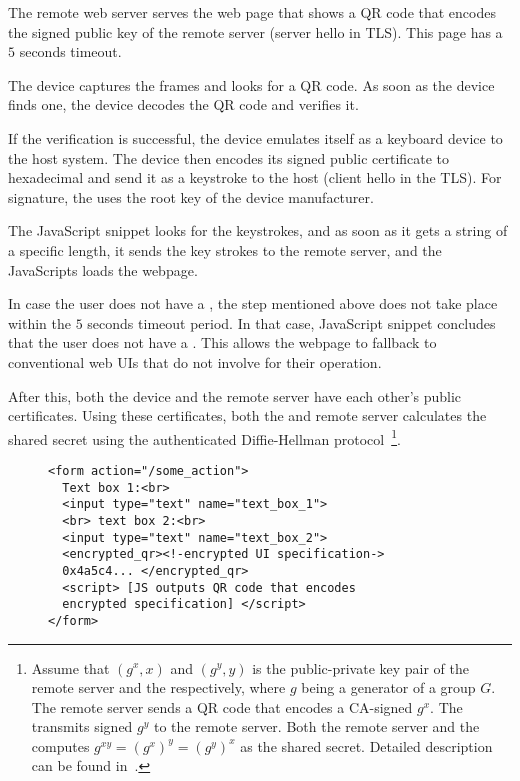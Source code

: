 \begin{mylist}
  \item The remote web server serves the web page that shows a QR code that encodes the signed public key of the remote server (server hello in TLS). This page has a $5$ seconds timeout.
  \item The device captures the frames and looks for a QR code. As soon as the device finds one, the device decodes the QR code and verifies it.
  \item If the verification is successful, the device emulates itself as a keyboard device to the host system. The device then encodes its signed public certificate to hexadecimal and send it as a keystroke to the host (client hello in the TLS). For signature, the \device uses the root key of the device manufacturer.
  \item The \name  JavaScript snippet looks for the keystrokes, and as soon as it gets a string of a specific length, it sends the key strokes to the remote server, and the \name JavaScripts loads the webpage.
  \item In case the user does not have a \device, the step mentioned above does not take place within the $5$ seconds timeout period. In that case, \name JavaScript snippet concludes that the user does not have a \device. This allows the webpage to fallback to conventional web UIs that do not involve \device for their operation.
\end{mylist}

After this, both the device and the remote server have each other's public certificates. Using these certificates, both the \device and remote server calculates the shared secret using the authenticated Diffie-Hellman protocol~\footnote{Assume that $(g^x, x)$ and $(g^y, y)$ is the public-private key pair of the remote server and the \device respectively, where $g$ being a generator of a group $G$. The remote server sends a QR code that encodes a CA-signed $g^x$. The \device transmits signed $g^y$ to the remote server. Both the remote server and the \device computes $g^{xy}=(g^x)^y=(g^y)^x$ as the shared secret. Detailed description can be found  in~\cite{blake1998authenticated}.}.




\begin{figure}[t]
\small
\begin{lstlisting}[mathescape=true]
<form action="/some_action">
  Text box 1:<br>
  <input type="text" name="text_box_1">
  <br> text box 2:<br>
  <input type="text" name="text_box_2">
  <encrypted_qr><!-encrypted UI specification->
  0x4a5c4... </encrypted_qr>
  <script> [JS outputs QR code that encodes 
  encrypted specification] </script>
</form> 
\end{lstlisting} 
\end{figure}



